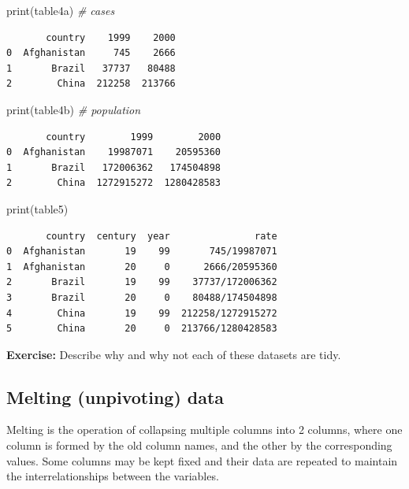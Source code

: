 \documentclass[
  letterpaper,
]{scrbook}
\newenvironment{Shaded}{\begin{snugshade}}{\end{snugshade}}
\newcommand{\BuiltInTok}[1]{#1}
\newcommand{\CommentTok}[1]{\textcolor[rgb]{0.56,0.35,0.01}{\textit{#1}}}
\newcommand{\NormalTok}[1]{#1}
\begin{document}
\begin{Shaded}
\begin{Highlighting}[]
\BuiltInTok{print}\NormalTok{(table4a) }\CommentTok{# cases}
\end{Highlighting}
\end{Shaded}

\begin{verbatim}
       country    1999    2000
0  Afghanistan     745    2666
1       Brazil   37737   80488
2        China  212258  213766
\end{verbatim}

\begin{Shaded}
\begin{Highlighting}[]
\BuiltInTok{print}\NormalTok{(table4b) }\CommentTok{# population}
\end{Highlighting}
\end{Shaded}

\begin{verbatim}
       country        1999        2000
0  Afghanistan    19987071    20595360
1       Brazil   172006362   174504898
2        China  1272915272  1280428583
\end{verbatim}

\begin{Shaded}
\begin{Highlighting}[]
\BuiltInTok{print}\NormalTok{(table5)}
\end{Highlighting}
\end{Shaded}

\begin{verbatim}
       country  century  year               rate
0  Afghanistan       19    99       745/19987071
1  Afghanistan       20     0      2666/20595360
2       Brazil       19    99    37737/172006362
3       Brazil       20     0    80488/174504898
4        China       19    99  212258/1272915272
5        China       20     0  213766/1280428583
\end{verbatim}

\textbf{Exercise:} Describe why and why not each of these datasets are tidy.

\hypertarget{melting-unpivoting-data}{%
\subsection{Melting (unpivoting) data}\label{melting-unpivoting-data}}

Melting is the operation of collapsing multiple columns into 2 columns, where one column is formed by the old column names, and the other by the corresponding values. Some columns may be kept fixed and their data are repeated to maintain the interrelationships between the variables.
\end{document}
